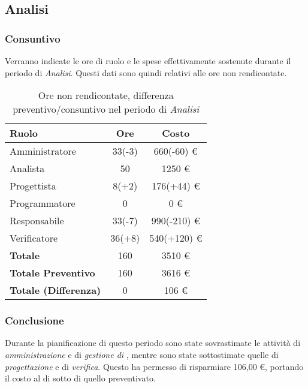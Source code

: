 \subsection{Analisi}
\subsubsection{Consuntivo}
Verranno indicate le ore di ruolo e le spese effettivamente sostenute durante il periodo di \textit{Analisi}. Questi dati sono quindi relativi alle ore non rendicontate.

\begin{table}[H]
	\centering
	\begin{tabular}{ l c c }
		\textbf{Ruolo} & \textbf{Ore} & \textbf{Costo} \\
		\hline
		Amministratore & 33(-3) & 660(-60) \euro{} \\
		Analista & 50 & 1250 \euro{} \\
		Progettista & 8(+2) & 176(+44) \euro{} \\
		Programmatore & 0 & 0 \euro{} \\
		Responsabile & 33(-7) & 990(-210) \euro{} \\
		Verificatore & 36(+8) & 540(+120) \euro{} \\
		\hline
		\textbf{Totale \glossaryItem{Consuntivo}} & 160 & 3510 \euro{} \\
		\hline
		\textbf{Totale Preventivo} & 160 & 3616 \euro{} \\
		\hline
		\textbf{Totale (Differenza)} & 0 & 106 \euro{} \\
		\hline
	\end{tabular}
	\caption{Ore non rendicontate, differenza preventivo/consuntivo nel periodo di \textit{Analisi}}
\end{table}



\subsubsection{Conclusione}
Durante la pianificazione di questo periodo sono state sovrastimate le attivit\`a di \textit{amministrazione} e di \textit{gestione di }, mentre sono state sottostimate quelle di \textit{progettazione} e di \textit{verifica}.
Questo ha permesso di risparmiare 106,00 \euro{}, portando il costo  al di sotto di quello preventivato.
\newpage


